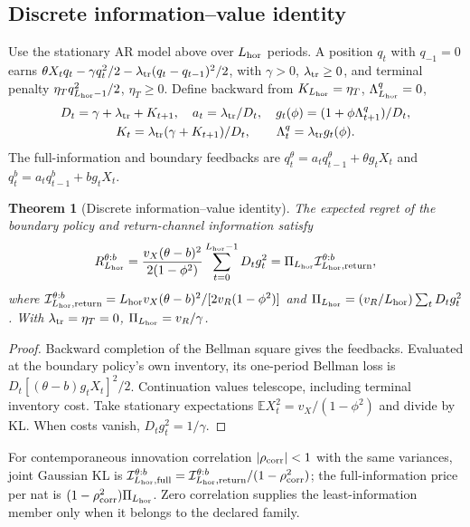 \documentclass[11pt]{article}
\numberwithin{equation}{section}
\theoremstyle{plain}
\newtheorem{theorem}{Theorem}[section]
\theoremstyle{definition}
\theoremstyle{remark}
\begin{document}
\subsection{Discrete information--value identity}\label{discrete-g2-informationeconomic-conservation}
Use the stationary AR model above over $L_{\rm hor}$ periods. A position $q_t$ with $q_{-1}=0$ earns $\theta X_tq_t-\gamma q_t^2/2-\lambda_{\rm tr}(q_t-q_{t-1})^2/2$, with $\gamma>0$, $\lambda_{\rm tr}\ge0$, and terminal penalty $\eta_Tq_{L_{\rm hor}-1}^2/2$, $\eta_T\ge0$. Define backward from $K_{L_{\rm hor}}=\eta_T$, $\Lambda_{L_{\rm hor}}^q=0$,
\[
\begin{gathered}
D_t=\gamma+\lambda_{\rm tr}+K_{t+1},\quad a_t=\lambda_{\rm tr}/D_t,\quad
g_t(\phi)=(1+\phi\Lambda_{t+1}^q)/D_t,\\
K_t=\lambda_{\rm tr}(\gamma+K_{t+1})/D_t,\qquad \Lambda_t^q=\lambda_{\rm tr}g_t(\phi).
\end{gathered}
\]
The full-information and boundary feedbacks are $q_t^\theta=a_tq_{t-1}^\theta+\theta g_tX_t$ and $q_t^b=a_tq_{t-1}^b+bg_tX_t$.
\begin{theorem}[Discrete information--value identity]\label{thm:g2-conservation}
The expected regret of the boundary policy and return-channel information satisfy
\[
R_{L_{\rm hor}}^{\theta:b}
=\frac{v_X(\theta-b)^2}{2(1-\phi^2)}\sum_{t=0}^{L_{\rm hor}-1}D_tg_t^2
=\Pi_{L_{\rm hor}}\mathcal I_{L_{\rm hor},\rm return}^{\theta:b},
\]
where $\mathcal I_{L_{\rm hor},\rm return}^{\theta:b}=L_{\rm hor}v_X(\theta-b)^2/[2v_R(1-\phi^2)]$ and $\Pi_{L_{\rm hor}}=(v_R/L_{\rm hor})\sum_tD_tg_t^2$. With $\lambda_{\rm tr}=\eta_T=0$, $\Pi_{L_{\rm hor}}=v_R/\gamma$.
\end{theorem}
\begin{proof}
Backward completion of the Bellman square gives the feedbacks. Evaluated at the boundary policy's own inventory, its one-period Bellman loss is $D_t[(\theta-b)g_tX_t]^2/2$. Continuation values telescope, including terminal inventory cost. Take stationary expectations $\mathbb E X_t^2=v_X/(1-\phi^2)$ and divide by KL. When costs vanish, $D_tg_t^2=1/\gamma$.
\end{proof}
For contemporaneous innovation correlation $|\rho_{\rm corr}|<1$ with the same variances, joint Gaussian KL is $\mathcal I_{L_{\rm hor},\rm full}^{\theta:b}=\mathcal I_{L_{\rm hor},\rm return}^{\theta:b}/(1-\rho_{\rm corr}^2)$; the full-information price per nat is $(1-\rho_{\rm corr}^2)\Pi_{L_{\rm hor}}$. Zero correlation supplies the least-information member only when it belongs to the declared family.
\end{document}
